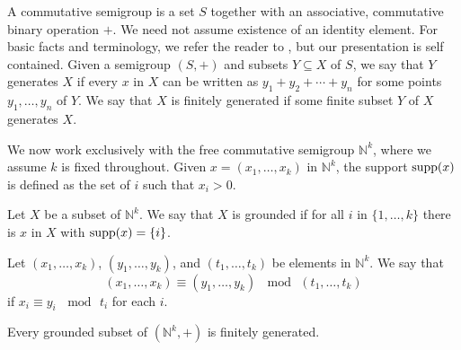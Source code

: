 \documentclass[review]{elsarticle}
\begin{document}
A commutative semigroup is a set $S$ together with an
associative, commutative binary operation $+$. We need not assume
existence of an identity element. For basic facts and terminology,
we refer the reader to \cite{grillet}, but our presentation is
self contained.
Given a semigroup $(S,+)$ and
subsets $Y\subseteq X$ of $S$, we say that $Y$ generates $X$ if
every $x$ in $X$ can be written as $y_1+y_2+\cdots+y_n$ for
some points $y_1,\ldots,y_n$ of $Y$. We say that $X$ is finitely
generated if some finite subset $Y$  of $X$ generates $X$.

We now work exclusively with the free commutative semigroup
$\mathbb{N}^k$, where we assume $k$ is fixed throughout.
Given $x=(x_1,\ldots,x_k)$ in $\mathbb{N}^k$, the support $\hbox{supp}(x)$
is defined as the set of $i$ such that $x_i>0$.

\begin{dfn}
Let $X$ be a subset of $\mathbb{N}^k$. We say that $X$ is grounded if for all
$i$ in $\{1,\ldots,k\}$ there is $x$ in $X$ with $\hbox{supp}(x)=\{i\}$.
\end{dfn}

Let $(x_1,\ldots,x_k)$, $(y_1,\ldots,y_k)$,
and $(t_1,\ldots,t_k)$ be elements in $\mathbb{N}^k$. We say that
$$(x_1,\ldots,x_k)\equiv(y_1,\ldots,y_k)\,\mod\, (t_1,\ldots,t_k)$$
if $x_i\equiv y_i\,\mod\, t_i$ for each $i$.

\begin{lem}\label{semlem} %
Every grounded subset of $(\mathbb{N}^k,+)$ is finitely generated.
\end{lem}
\end{document}

